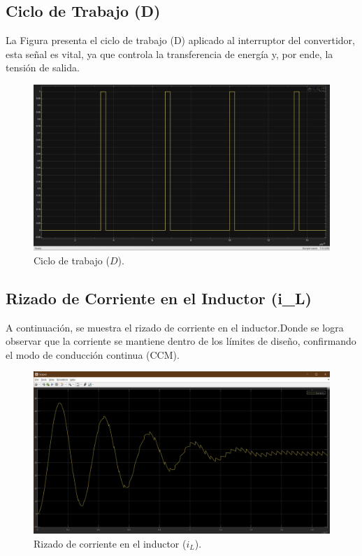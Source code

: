 \subsection{Ciclo de Trabajo (D)}
La Figura presenta el ciclo de trabajo (D) aplicado al interruptor del convertidor, esta señal es vital, ya que controla la transferencia de energía y, por ende, la tensión de salida.

\begin{figure}[ht!]
    \centering
    \includegraphics[width=0.9\linewidth]{fot/D.jpeg} 
    \caption{Ciclo de trabajo ($D$).}
    \label{fig:D}
\end{figure}

\subsection{Rizado de Corriente en el Inductor (i\_L)}

A continuación, se muestra el rizado de corriente en el inductor.Donde se logra observar que la corriente se mantiene dentro de los límites de diseño, confirmando el modo de conducción continua (CCM).

\begin{figure}[ht!]
    \centering
    \includegraphics[width=0.9\linewidth]{fot/L.png} 
    \caption{Rizado de corriente en el inductor ($i_L$).}
    \label{fig:il}
\end{figure}


